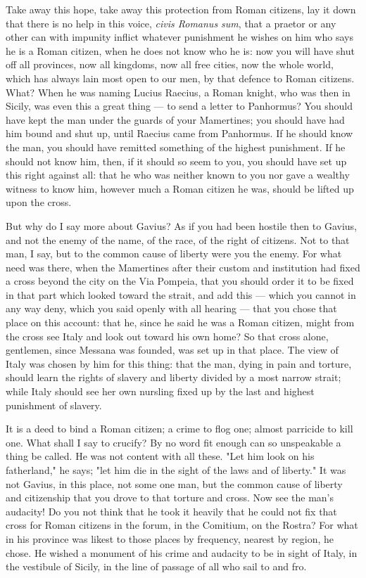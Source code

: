  Take away this hope, take away this protection from Roman citizens, lay it down that there is no help in this voice, \textit{civis Romanus sum}, that a praetor or any other can with impunity inflict whatever punishment he wishes on him who says he is a Roman citizen, when he does not know who he is: now you will have shut off all provinces, now all kingdoms, now all free cities, now the whole world, which has always lain most open to our men, by that defence to Roman citizens. What? When he was naming Lucius Raecius, a Roman knight, who was then in Sicily, was even this a great thing --- to send a letter to Panhormus? You should have kept the man under the guards of your Mamertines; you should have had him bound and shut up, until Raecius came from Panhormus. If he should know the man, you should have remitted something of the highest punishment. If he should not know him, then, if it should so seem to you, you should have set up this right against all: that he who was neither known to you nor gave a wealthy witness to know him, however much a Roman citizen he was, should be lifted up upon the cross.

 But why do I say more about Gavius? As if you had been hostile then to Gavius, and not the enemy of the name, of the race, of the right of citizens. Not to that man, I say, but to the common cause of liberty were you the enemy. For what need was there, when the Mamertines after their custom and institution had fixed a cross beyond the city on the Via Pompeia, that you should order it to be fixed in that part which looked toward the strait, and add this --- which you cannot in any way deny, which you said openly with all hearing --- that you chose that place on this account: that he, since he said he was a Roman citizen, might from the cross see Italy and look out toward his own home? So that cross alone, gentlemen, since Messana was founded, was set up in that place. The view of Italy was chosen by him for this thing: that the man, dying in pain and torture, should learn the rights of slavery and liberty divided by a most narrow strait; while Italy should see her own nursling fixed up by the last and highest punishment of slavery.

 It is a deed to bind a Roman citizen; a crime to flog one; almost parricide to kill one. What shall I say to crucify? By no word fit enough can so unspeakable a thing be called. He was not content with all these. "Let him look on his fatherland," he says; "let him die in the sight of the laws and of liberty." It was not Gavius, in this place, not some one man, but the common cause of liberty and citizenship that you drove to that torture and cross. Now see the man's audacity! Do you not think that he took it heavily that he could not fix that cross for Roman citizens in the forum, in the Comitium, on the Rostra? For what in his province was likest to those places by frequency, nearest by region, he chose. He wished a monument of his crime and audacity to be in sight of Italy, in the vestibule of Sicily, in the line of passage of all who sail to and fro.

